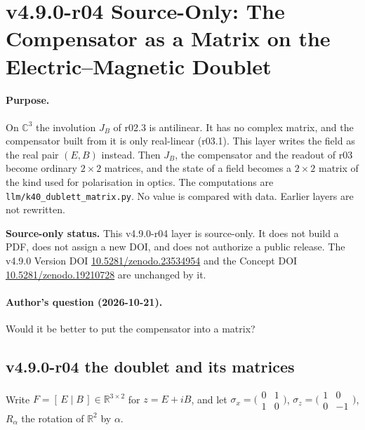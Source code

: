 \clearpage
\section*{v4.9.0-r04 Source-Only: The Compensator as a Matrix on the Electric--Magnetic Doublet}
\label{sec:v490-r04-doublet-matrix}

\paragraph{Purpose.}
On \(\mathbb C^3\) the involution \(J_B\) of r02.3 is antilinear.  It has no complex matrix, and the compensator built from
it is only real-linear (r03.1).  This layer writes the field as the real pair \((E,B)\) instead.  Then \(J_B\), the
compensator and the readout of r03 become ordinary \(2\times2\) matrices, and the state of a field becomes a
\(2\times2\) matrix of the kind used for polarisation in optics.  The computations are
\texttt{llm/k40\_dublett\_matrix.py}.  No value is compared with data.  Earlier layers are not rewritten.

\noindent\textbf{Source-only status.}
This v4.9.0-r04 layer is source-only.  It does not build a PDF, does not assign a new DOI,
and does not authorize a public release.  The v4.9.0 Version DOI
\href{https://doi.org/10.5281/zenodo.23534954}{10.5281/zenodo.23534954} and the Concept DOI
\href{https://doi.org/10.5281/zenodo.19210728}{10.5281/zenodo.19210728} are unchanged by it.

\paragraph{Author's question (2026-10-21).}
Would it be better to put the compensator into a matrix?

\subsection*{v4.9.0-r04 the doublet and its matrices}
\label{subsec:v490-r04-doublet}

Write \(F=[\,E\mid B\,]\in\mathbb R^{3\times2}\) for \(z=E+iB\), and let
\(\sigma_x=\bigl(\begin{smallmatrix}0&1\\1&0\end{smallmatrix}\bigr)\),
\(\sigma_z=\bigl(\begin{smallmatrix}1&0\\0&-1\end{smallmatrix}\bigr)\), \(R_\alpha\) the rotation of \(\mathbb R^2\) by
\(\alpha\).

